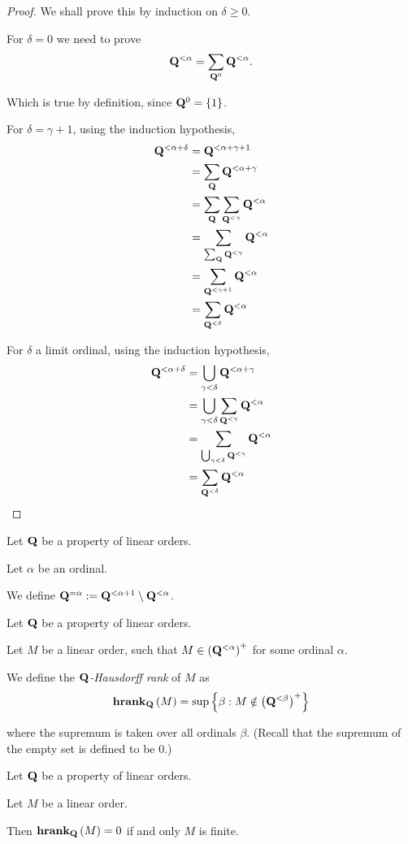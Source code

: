\begin{proof}
  We shall prove this by induction on $\delta \ge 0$.

  For $\delta = 0$ we need to prove
  \[
    \mathbf{Q}^{< \alpha} = \sum_{\mathbf{Q}^0}{\mathbf{Q}^{< \alpha}}.
  \]

  Which is true by definition, since $\mathbf{Q}^0 = \left\{ {1} \right\}$.

  For $\delta = \gamma + 1$, using the induction hypothesis,
  \[
    \begin{aligned}
      \mathbf{Q}^{< \alpha + \delta}
       & = \mathbf{Q}^{< \alpha + \gamma + 1}                     \\
       & = \sum_{\mathbf{Q}}{\mathbf{Q}^{< \alpha + \gamma}}             \\
       & = \sum_{\mathbf{Q}}{\sum_{\mathbf{Q}^{< \gamma}}{\mathbf{Q}^{< \alpha}}} \\
       & = \sum_{\sum_{\mathbf{Q}}{\mathbf{Q}^{< \gamma}}}{\mathbf{Q}^{< \alpha}} \\
       & = \sum_{\mathbf{Q}^{< \gamma + 1}}{\mathbf{Q}^{< \alpha}}         \\
       & = \sum_{\mathbf{Q}^{< \delta}}{\mathbf{Q}^{< \alpha}}
    \end{aligned}
  \]

  For $\delta$ a limit ordinal, using the induction hypothesis,
  \[
    \begin{aligned}
      \mathbf{Q}^{< \alpha + \delta}
       & = \bigcup_{\gamma < \delta}{\mathbf{Q}^{< \alpha + \gamma}}             \\
       & = \bigcup_{\gamma < \delta}{\sum_{\mathbf{Q}^{< \gamma}}{\mathbf{Q}^{< \alpha}}} \\
       & = \sum_{\bigcup_{\gamma < \delta}{\mathbf{Q}^{< \gamma}}}{\mathbf{Q}^{< \alpha}} \\
       & = \sum_{\mathbf{Q}^{< \delta}}{\mathbf{Q}^{< \alpha}}
    \end{aligned}
  \]

\end{proof}

\begin{definition}
  Let $\mathbf{Q}$ be a property of linear orders.

  Let $\alpha$ be an ordinal.

  We define $\mathbf{Q}^{= \alpha} := \mathbf{Q}^{< \alpha + 1} \setminus \mathbf{Q}^{< \alpha}$.
\end{definition}

\begin{definition}
  Let $\mathbf{Q}$ be a property of linear orders.

  Let $M$ be a linear order, such that
  $M \in \left( {\mathbf{Q}^{< \alpha}} \right)^+$ for some ordinal $\alpha$.

  We define the \emph{$\mathbf{Q}$-Hausdorff rank} of $M$ as
  \[
    \mathbf{hrank}_{\mathbf{Q}} \left( {M} \right) = \sup \left\{ {\beta : M \notin \left( {\mathbf{Q}^{< \beta}} \right)^{+}} \right\}
  \]

  where the supremum is taken over all ordinals $\beta$.
  (Recall that the supremum of the empty set is defined to be $0$.)

\end{definition}

\begin{example}
  Let $\mathbf{Q}$ be a property of linear orders.

  Let $M$ be a linear order.

  Then $\mathbf{hrank}_{\mathbf{Q}} \left( {M} \right) = 0$ if and only $M$ is finite.
\end{example}
